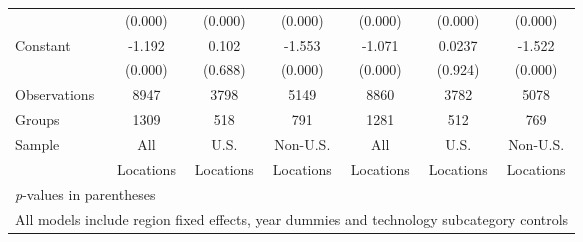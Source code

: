 \begin{table}[htbp]
\begin{tabular}{l*{6}{c}}
                &  (0.000)&  (0.000)&  (0.000)&  (0.000)&  (0.000)&  (0.000)\\
Constant        &   -1.192&    0.102&   -1.553&   -1.071&   0.0237&   -1.522\\
                &  (0.000)&  (0.688)&  (0.000)&  (0.000)&  (0.924)&  (0.000)\\
\hline
Observations    &     8947&     3798&     5149&     8860&     3782&     5078\\
Groups          &     1309&      518&      791&     1281&      512&      769\\
Sample&All &U.S. &Non-U.S.&All &U.S. &Non-U.S. \\
          &Locations &Locations&Locations&Locations &Locations&Locations \\\hline\hline
\multicolumn{7}{l}{\footnotesize \textit{p}-values in parentheses}\\
\multicolumn{7}{l}{\footnotesize All models include region fixed effects, year dummies and technology subcategory controls}\\
\end{tabular}
\end{table}
